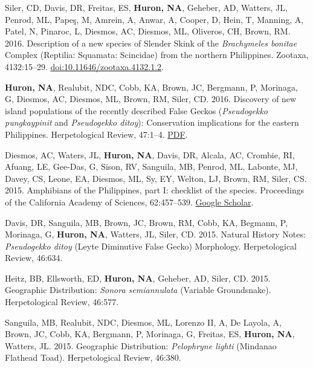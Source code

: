 \documentclass[11pt]{article}
\begin{document}
{\begin{etaremune}[leftmargin=0.45in, rightmargin=0.2in, listparindent=0pt, itemindent=-12pt]
 \item Siler, CD, Davis, DR, Freitas, ES, \textbf{Huron, NA}, Geheber, AD, Watters, JL, Penrod, ML, Pape{{\c{s}}}, M, Amrein, A, Anwar, A, Cooper, D, Hein, T, Manning, A, Patel, N, Pinaroc, L, Diesmos, AC, Diesmos, ML, Oliveros, CH, Brown, RM. 2016. Description of a new species of Slender Skink of the \textit{Brachymeles bonitae} Complex (Reptilia: Squamata: Scincidae) from the northern Philippines. Zootaxa, 4132:15--29. \href{https://doi.org/10.11646/zootaxa.4132.1.2}{\color{blue}doi:10.11646/zootaxa.4132.1.2}.
 \item \textbf{Huron, NA}, Realubit, NDC, Cobb, KA, Brown, JC, Bergmann, P, Morinaga, G, Diesmos, AC, Diesmos, ML, Brown, RM, Siler, CD. 2016. Discovery of new island populations of the recently described False Geckos (\textit{Pseudogekko pungkaypinit} and \textit{Pseudogekko ditoy}): Conservation implications for the eastern Philippines. Herpetological Review, 47:1--4. \href{https://github.com/nahuron/publication_pdfs/blob/main/2016.Huron.etal.Pseudogekko.Samar.pdf}{\color{blue}PDF}.
 \item Diesmos, AC, Waters, JL, \textbf{Huron, NA}, Davis, DR, Alcala, AC, Crombie, RI, Afuang, LE, Gee-Das, G, Sison, RV, Sanguila, MB, Penrod, ML, Labonte, MJ, Davey, CS, Leone, EA, Diesmos, ML, Sy, EY, Welton, LJ, Brown, RM, Siler, CS. 2015. Amphibians of the Philippines, part I: checklist of the species. Proceedings of the California Academy of Sciences, 62:457--539. \href{https://scholar.google.com/scholar_lookup?title=Amphibians+of+the+Philippines%2C+part+I%3A+checklist+of+the+species&author=AC+Diesmos&author=JL+Watters&author=NA+Huron&author=DR+Davis&author=AC+Alcala&author=RI+Crombie&author=LE+Afuang&author=G+Gee-Das&author=RV+Sison&author=MB+Sanguila&author=ML+Penrod&publication_year=2015}{\color{blue}Google Scholar}.
 \item Davis, DR, Sanguila, MB, Brown, JC, Brown, RM, Cobb, KA, Begmann, P, Morinaga, G, \textbf{Huron, NA}, Watters, JL, Siler, CD. 2015. Natural History Notes: \textit{Pseudogekko ditoy} (Leyte Diminutive False Gecko) Morphology. Herpetological Review, 46:634.
 \item Heitz, BB, Ellsworth, ED, \textbf{Huron, NA}, Geheber, AD, Siler, CD. 2015. Geographic Distribution: \textit{Sonora semiannulata} (Variable Groundsnake). Herpetological Review, 46:577.
 \item Sanguila, MB, Realubit, NDC, Diesmos, ML, Lorenzo II, A, De Layola, A, Brown, JC, Cobb, KA, Bergmann, P, Morinaga, G, Freitas, ES, \textbf{Huron, NA}, Watters, JL. 2015. Geographic Distribution: \textit{Pelophryne lighti} (Mindanao Flathead Toad). Herpetological Review, 46:380.

\end{etaremune}}
\end{document}
